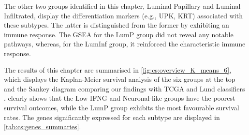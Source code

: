 The other two groups identified in this chapter, Luminal Papillary and Luminal Infiltrated, display the differentiation markers (e.g., UPK, KRT) associated with these subtypes. The latter is distinguished from the former by exhibiting an immune response. The GSEA for the LumP group did not reveal any notable pathways, whereas, for the LumInf group, it reinforced the characteristic immune response.


The results of this chapter are summarised in \cref{fig:cs:overview_K_means_6}, which displays the Kaplan-Meier survival analysis of the six groups at the top and the Sankey diagram comparing our findings with TCGA and Lund classifiers \citep{Robertson2017-mg,Marzouka2018-ge}.  clearly shows that the Low IFNG and Neuronal-like groups have the poorest survival outcomes, while the LumP group exhibits the most favourable survival rates. The genes significantly expressed for each subtype are displayed in \cref{tab:cs:genes_summaries}.
 
